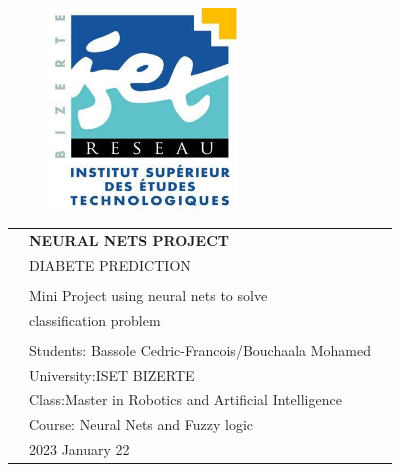 \begin{center}

    \vspace*{1cm}
    
    \begin{figure}
      \raggedleft
      \begin{minipage}{4cm}
      \includegraphics[width=5cm]{images/logo-isetbz.png}
      \end{minipage}
    \end{figure}
    
    \vspace*{2cm}
    
    \vspace*{0.1in}
    
    \begin{spacing}{1.7}
    
    \begin{tabular}{p{4cm} ll}
    
    & \textbf{\huge NEURAL NETS PROJECT}\\ %
    & \Large DIABETE PREDICTION\\ %
    & \\
    & \large Mini Project using neural nets to solve \\
    & \large classification problem  \\ 
    
    & \\
    & \large Students: Bassole Cedric-Francois/Bouchaala Mohamed\\
    & \large University:ISET BIZERTE \\
    & \large Class:Master in Robotics and Artificial Intelligence \\
    & \large Course: Neural Nets and Fuzzy logic \\
    & \large 2023 January 22
    \end{tabular}
    
    \end{spacing}
    
    \end{center}
    
    
    
    \thispagestyle{empty} %
    \clearpage\setcounter{page}{1} %
